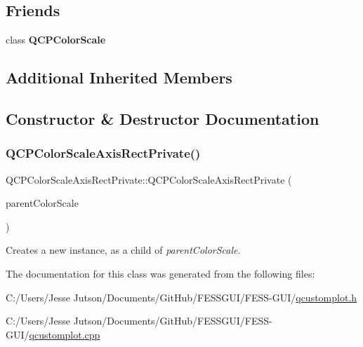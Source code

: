 \subsection*{Friends}
\begin{DoxyCompactItemize}
\item 
\hypertarget{class_q_c_p_color_scale_axis_rect_private_a60f6031408a325ebd1bbbad1ccf9b897}{}\label{class_q_c_p_color_scale_axis_rect_private_a60f6031408a325ebd1bbbad1ccf9b897} 
class {\bfseries Q\+C\+P\+Color\+Scale}
\end{DoxyCompactItemize}
\subsection*{Additional Inherited Members}


\subsection{Constructor \& Destructor Documentation}
\hypertarget{class_q_c_p_color_scale_axis_rect_private_ad3b242f75dd2b33581364a4e668a80db}{}\label{class_q_c_p_color_scale_axis_rect_private_ad3b242f75dd2b33581364a4e668a80db} 
\subsubsection{\texorpdfstring{Q\+C\+P\+Color\+Scale\+Axis\+Rect\+Private()}{QCPColorScaleAxisRectPrivate()}}
{\footnotesize\ttfamily Q\+C\+P\+Color\+Scale\+Axis\+Rect\+Private\+::\+Q\+C\+P\+Color\+Scale\+Axis\+Rect\+Private (\begin{DoxyParamCaption}\item[{\hyperlink{class_q_c_p_color_scale}{Q\+C\+P\+Color\+Scale} $\ast$}]{parent\+Color\+Scale }\end{DoxyParamCaption})\hspace{0.3cm}{\ttfamily [explicit]}}

Creates a new instance, as a child of {\itshape parent\+Color\+Scale}. 

The documentation for this class was generated from the following files\+:\begin{DoxyCompactItemize}
\item 
C\+:/\+Users/\+Jesse Jutson/\+Documents/\+Git\+Hub/\+F\+E\+S\+S\+G\+U\+I/\+F\+E\+S\+S-\/\+G\+U\+I/\hyperlink{qcustomplot_8h}{qcustomplot.\+h}\item 
C\+:/\+Users/\+Jesse Jutson/\+Documents/\+Git\+Hub/\+F\+E\+S\+S\+G\+U\+I/\+F\+E\+S\+S-\/\+G\+U\+I/\hyperlink{qcustomplot_8cpp}{qcustomplot.\+cpp}\end{DoxyCompactItemize}
